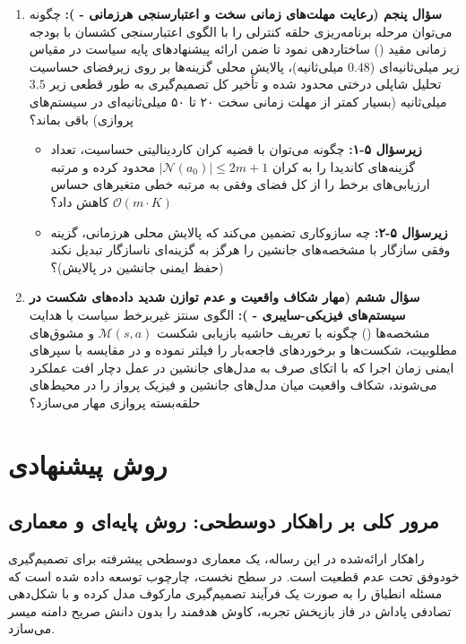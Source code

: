 \documentclass[oneside,openany,phd]{TMU-Thesis}
\begin{document}
\begin{enumerate}
  \item \textbf{سؤال پنجم (رعایت مهلت‌های زمانی سخت و اعتبارسنجی هرزمانی - ):} چگونه می‌توان مرحله برنامه‌ریزی حلقه کنترلی را با الگوی اعتبارسنجی کشسان با بودجه زمانی مقید (\caepv) ساختاردهی نمود تا ضمن ارائه پیشنهادهای پایه سیاست در مقیاس زیر میلی‌ثانیه‌ای ($0.48$ میلی‌ثانیه)، پالایش محلی گزینه‌ها بر روی زیرفضای حساسیت تحلیل شاپلی درختی محدود شده و تأخیر کل تصمیم‌گیری به طور قطعی زیر $3.5$ میلی‌ثانیه (بسیار کمتر از مهلت زمانی سخت ۲۰ تا ۵۰ میلی‌ثانیه‌ای در سیستم‌های پروازی) باقی بماند؟
  \begin{itemize}
      \item \textbf{زیرسؤال ۵-۱:} چگونه می‌توان با قضیه کران کاردینالیتی حساسیت، تعداد گزینه‌های کاندیدا را به کران $|\mathcal{N}(a_0)| \le 2m + 1$ محدود کرده و مرتبه ارزیابی‌های برخط را از کل فضای وفقی به مرتبه خطی متغیرهای حساس $\mathcal{O}(m \cdot K)$ کاهش داد؟
      \item \textbf{زیرسؤال ۵-۲:} چه سازوکاری تضمین می‌کند که پالایش محلی هرزمانی، گزینه وفقی سازگار با مشخصه‌های جانشین را هرگز به گزینه‌ای ناسازگار تبدیل نکند (حفظ ایمنی جانشین در پالایش)؟
  \end{itemize}

  \item \textbf{سؤال ششم (مهار شکاف واقعیت و عدم توازن شدید داده‌های شکست در سیستم‌های فیزیکی-سایبری - ):} الگوی سنتز غیربرخط سیاست با هدایت مشخصه‌ها (\sgos) چگونه با تعریف حاشیه بازیابی شکست $\mathcal{M}(s, a)$ و مشوق‌های مطلوبیت، شکست‌ها و برخوردهای فاجعه‌بار را فیلتر نموده و در مقایسه با سپرهای ایمنی زمان اجرا که با اتکای صرف به مدل‌های جانشین در عمل دچار افت عملکرد می‌شوند، شکاف واقعیت میان مدل‌های جانشین و فیزیک پرواز را در محیط‌های حلقه‌بسته پروازی مهار می‌سازد؟
\end{enumerate}

\section{روش پیشنهادی}

\subsection{مرور کلی بر راهکار دوسطحی: روش پایه‌ای  و معماری \texorpdfstring{\rsdrlplus}{RS-DRL+}}

راهکار ارائه‌شده در این رساله، یک معماری دوسطحی پیشرفته برای تصمیم‌گیری خودوفق تحت عدم قطعیت است. در سطح نخست، چارچوب  توسعه داده شده است که مسئله انطباق را به صورت یک فرآیند تصمیم‌گیری مارکوف مدل کرده و با شکل‌دهی تصادفی پاداش در فاز بازپخش تجربه، کاوش هدفمند را بدون دانش صریح دامنه میسر می‌سازد. 
\end{document}
